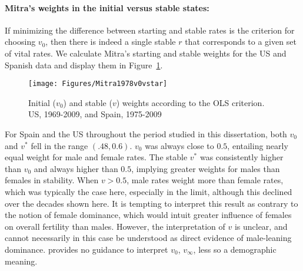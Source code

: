 \paragraph{Mitra's weights in the initial versus stable states: } If minimizing
the difference between starting and stable rates is the criterion for choosing $v_0$, 
then there is indeed a single stable $r$ that
corresponds to a given set of vital rates. We calculate Mitra's starting and
stable weights for the US and Spanish data and display them
in Figure~\ref{fig:Mitra1978v0vstar}.

\begin{figure}[ht!]
        \centering  
          \caption{Initial ($v_0$) and stable ($v$) weights according to the OLS
          criterion. US, 1969-2009, and Spain, 1975-2009 
          \citet{mitra1978derivation}}
           \quad
           \texttt{[image: Figures/Mitra1978v0vstar]}
          \label{fig:Mitra1978v0vstar}
\end{figure}

For Spain and the US throughout the period studied in this dissertation, both
$v_0$ and $v^\ast$ fell in the range $(.48,0.6)$. $v_0$ was always
close to $0.5$, entailing nearly equal weight for male and female rates.
The stable $v^\ast$ was consistently higher than $v_0$ and always higher than
$0.5$, implying greater weights for males than females in stability. When $v >
0.5$, male rates weight more than female rates, which was typically the case
here, especially in the limit, although this declined over the decades shown here. It is
tempting to interpret this result as contrary to the notion of female dominance,
which would intuit greater influence of females on overall fertility than
males. However, the interpretation of $v$ is unclear, and cannot necessarily in
this case be understood as direct evidence of male-leaning dominance.
\citet{mitra1978derivation} provides no guidance to interpret $v_0$, $v_\infty$,
less so a demographic meaning. 
\FloatBarrier
